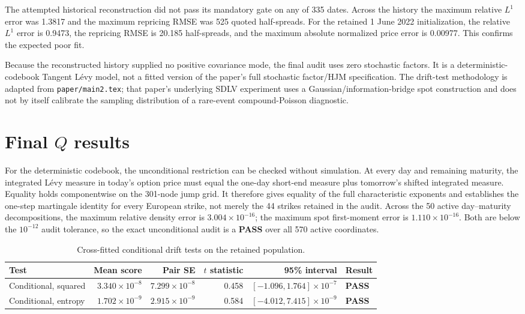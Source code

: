 \documentclass[11pt]{article}
\newcommand{\pass}{\textcolor{passgreen}{\textbf{PASS}}}
\begin{document}
The attempted historical reconstruction did not pass its mandatory gate on any
of 335 dates.  Across the history the maximum relative $L^1$ error was 1.3817
and the maximum repricing RMSE was 525 quoted half-spreads.  For the retained
1 June 2022 initialization, the relative $L^1$ error is 0.9473, the repricing
RMSE is 20.185 half-spreads, and the maximum absolute normalized price error is
0.00977.  This confirms the expected poor fit.

Because the reconstructed history supplied no positive covariance mode, the
final audit uses zero stochastic factors.  It is a deterministic-codebook
Tangent L\'evy model, not a fitted version of the paper's full stochastic
factor/HJM specification.  The drift-test methodology is adapted from
\texttt{paper/main2.tex}; that paper's underlying SDLV experiment uses a
Gaussian/information-bridge spot construction and does not by itself calibrate
the sampling distribution of a rare-event compound-Poisson diagnostic.

\section{Final \texorpdfstring{$Q$}{Q} results}

For the deterministic codebook, the unconditional restriction can be checked
without simulation.  At every day and remaining maturity, the integrated
L\'evy measure in today's option price must equal the one-day short-end measure
plus tomorrow's shifted integrated measure.  Equality holds componentwise on
the 301-node jump grid.  It therefore gives equality of the full characteristic
exponents and establishes the one-step martingale identity for every European
strike, not merely the 44 strikes retained in the audit.  Across the 50 active
day--maturity decompositions, the maximum relative density error is
$3.004\times10^{-16}$; the maximum spot first-moment error is
$1.110\times10^{-16}$.  Both are below the $10^{-12}$ audit tolerance, so the
exact unconditional audit is a \pass{} over all 570 active coordinates.

\begin{table}[h]
\centering
\small
\begin{tabular}{lrrrrl}
\toprule
Test & Mean score & Pair SE & $t$ statistic & 95\% interval & Result \\
\midrule
Conditional, squared
  & $3.340\times10^{-8}$ & $7.299\times10^{-8}$ & 0.458
  & $[-1.096,1.764]\times10^{-7}$ & \pass \\
Conditional, entropy
  & $1.702\times10^{-9}$ & $2.915\times10^{-9}$ & 0.584
  & $[-4.012,7.415]\times10^{-9}$ & \pass \\
\bottomrule
\end{tabular}
\caption{Cross-fitted conditional drift tests on the retained population.}
\end{table}
\end{document}
